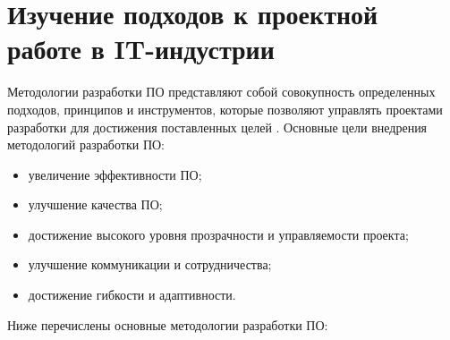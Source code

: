 \section{Изучение подходов к проектной работе в IT-индустрии}
Методологии разработки ПО представляют собой совокупность
определенных подходов, принципов и инструментов, которые позволяют
управлять проектами разработки для достижения поставленных целей \cite{metod-razr}.
Основные цели внедрения методологий разработки ПО:
\begin{itemize}
	\item увеличение эффективности ПО;
	\item улучшение качества ПО;
	\item достижение высокого уровня прозрачности и управляемости проекта;
	\item улучшение коммуникации и сотрудничества;
	\item достижение гибкости и адаптивности.
\end{itemize}
Ниже перечислены основные методологии разработки ПО:

